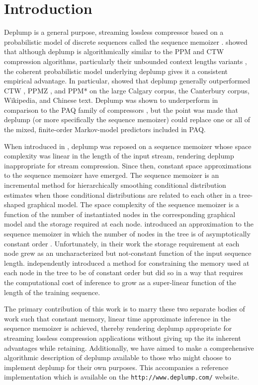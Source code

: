 \section{Introduction}
\label{sec:introduction}

Deplump \citep{Gasthaus2010} is a general purpose, streaming lossless compressor based on a probabilistic model of discrete sequences called the sequence memoizer \citep{Wood2009}.   \citeauthor{Gasthaus2010} showed that although deplump is algorithmically similar to the PPM and CTW compression algorithms, particularly their unbounded context lengths variants \citep{Cleary1997,Willems1998}, the coherent probabilistic model underlying deplump gives it a consistent empirical advantage.  In particular, \citeauthor{Gasthaus2010} showed that deplump generally outperformed CTW  \citep{Willems2009}, PPMZ \citep{Peltola2002}, and PPM* \citep{Cleary1997} on the large Calgary corpus, the Canterbury corpus, Wikipedia, and Chinese text.  Deplump was shown to underperform in comparison to the PAQ family of compressors \citep{Mahoney2005}, but the point was made that deplump (or more specifically the sequence memoizer) could replace one or all of the mixed, finite-order Markov-model predictors included in PAQ.  

When introduced in \citep{Gasthaus2010}, deplump was reposed on a sequence memoizer whose space complexity was linear in the length of the input stream, rendering deplump inappropriate for stream compression.  Since then, constant space approximations to the sequence memoizer have emerged.  The sequence memoizer is an incremental method for hierarchically smoothing conditional distribution estimates when those conditional distributions are related to each other in a tree-shaped graphical model.  The space complexity of the sequence memoizer is a function of the number of instantiated nodes in the corresponding graphical model and the storage required at each node. \citeauthor{Bartlett2010} introduced an approximation to the sequence memoizer in which the number of nodes in the tree is of asymptotically constant order \citep{Bartlett2010}.  Unfortunately, in their work the storage requirement at each node grew as an uncharacterized but not-constant function of the input sequence length.  \citeauthor{Gasthaus2011} independently introduced a method for constraining the memory used at each node in the tree to be of constant order  \citep{Gasthaus2011} but did so in a way that requires the computational cost of inference to grow as a super-linear function of the length of the training sequence.

The primary contribution of this work is to marry these two separate bodies of work such that constant memory, linear time approximate inference in the sequence memoizer is achieved, thereby rendering deplump appropriate for streaming lossless compression applications without giving up the its inherent advantages while retaining.  Additionally, we have aimed to make a comprehensive algorithmic description of deplump available to those who might choose to implement deplump  for their own purposes.  This accompanies a reference implementation which is available on the \texttt{http://www.deplump.com/} website.